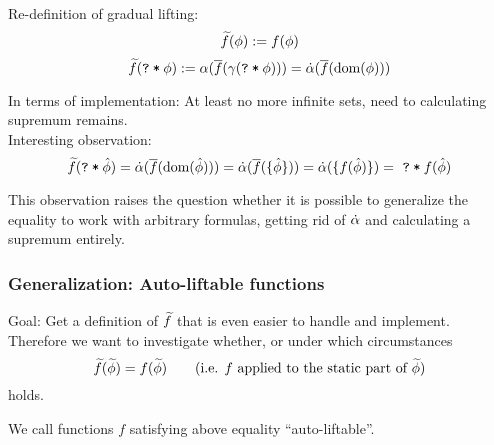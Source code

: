 \documentclass[11pt,a4paper]{article}
\begin{document}
~\\
Re-definition of gradual lifting:
$$\widetilde{f}(\phi) := f(\phi)$$ 
$$\widetilde{f}(\texttt{\texttt{?}\:*\:$\phi$}) := \alpha(\overline{f}(\gamma(\texttt{\texttt{?}\:*\:$\phi$}))) = \dot{\alpha}(\overline{f}(\text{dom}(\phi)))$$ 

In terms of implementation: At least no more infinite sets, need to calculating supremum remains.\\

Interesting observation:
$$\widetilde{f}(\texttt{\texttt{?}\:*\:$\hat{\phi}$}) = \dot{\alpha}(\overline{f}(\text{dom}(\hat{\phi}))) = \dot{\alpha}(\overline{f}(\{ \hat{\phi} \})) = \dot{\alpha}(\{ f(\hat{\phi}) \}) = \,\,\texttt{\texttt{?}\:*\:$f(\hat{\phi})$}$$

This observation raises the question whether it is possible to generalize the equality to work with arbitrary formulas, getting rid of $\dot{\alpha}$ and calculating a supremum entirely.




\subsubsection{Generalization: Auto-liftable functions}
Goal:
Get a definition of $\widetilde{f}$ that is even easier to handle and implement.
Therefore we want to investigate whether, or under which circumstances 
$$\widetilde{f}(\widetilde{\phi}) = f(\widetilde{\phi}) \quad\quad\text{(i.e. $f$ applied to the static part of $\widetilde{\phi}$)}$$
holds.

We call functions $f$ satisfying above equality “auto-liftable”.

\end{document}
